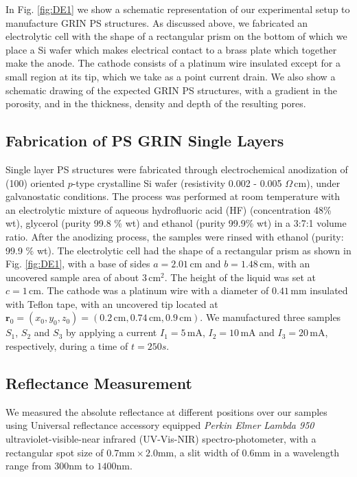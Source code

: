 \documentclass[review,sort&compress]{cas-sc}
\begin{document}
In Fig. \ref{fig:DE1} we show a schematic representation of our
experimental setup to manufacture GRIN PS structures.
As discussed above, we fabricated an electrolytic cell with the shape of a
rectangular prism on the bottom of which we place a Si wafer which makes
electrical contact to a brass plate
which together make the anode. The
cathode consists of a platinum wire insulated except for a small region
at its tip, which we take as a point current drain.
We also show a schematic drawing of the expected GRIN PS structures,
with a gradient in the porosity, and in the thickness, density and depth
of the resulting pores.

\subsection{Fabrication of PS  GRIN Single Layers}
\label{sec:fabrication-ps-grin}
Single layer PS structures were fabricated through electrochemical
anodization of (100) oriented $p$-type crystalline Si wafer
(resistivity 0.002 - 0.005 $ \Omega\,\text{cm}$), under galvanostatic
conditions. The process was performed at room temperature with an
electrolytic mixture of aqueous hydrofluoric
acid (HF) (concentration 48\% wt), glycerol (purity 99.8 \% wt) and
ethanol (purity 99.9\% wt) in a 3:7:1 volume ratio.
After the anodizing process, the samples were rinsed with
ethanol (purity: 99.9 $ \% $  wt). The electrolytic cell had the shape
of a rectangular prism as shown in Fig. \ref{fig:DE1}, with a base of
sides $a=2.01\,\text{cm}$ and $b=1.48\,\text{cm}$, with an uncovered sample area
of about $3\,\text{cm}^2$. The height of the liquid was set at
$c=1\,\text{cm}$. The cathode was a
platinum wire with a diameter of $0.41\,\text{mm}$ insulated with
Teflon tape, with an uncovered
tip located at $\bm r_0=(x_0,
y_0,z_0)=(0.2\,\text{cm},0.74\,\text{cm},0.9\,\text{cm})$.
We manufactured three samples $S_1$, $S_2$ and $S_3$ by applying a
current $I_1=5\,\text{mA}$, $I_2=10\,\text{mA}$ and
$I_3=20\,\text{mA}$, respectively, during a time of $t=250s$.

\subsection{Reflectance Measurement}
\label{sec:refl-meas}
We measured the absolute reflectance at different positions over our
samples using Universal reflectance accessory  equipped {\em Perkin Elmer Lambda 950}
ultraviolet-visible-near infrared (UV-Vis-NIR) spectro-photometer, with a rectangular spot size of
$0.7\text{mm}\times2.0\text{mm}$, a slit width of $0.6\text{mm}$ in
a wavelength range from $300\text{nm}$ to
$1400\text{nm}$.
\end{document}
